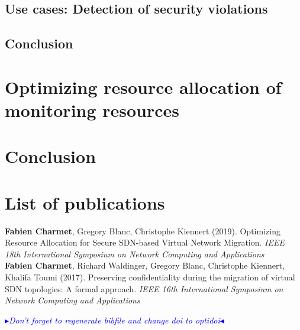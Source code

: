 \documentclass[a4paper, 11pt]{report}
\newcommand{\boxedtext}[1]{\fbox{\scriptsize\bfseries\textsf{#1}}}
\newcommand{\myremark}[2]{
   \textcolor{blue}{\boxedtext{#1}
      {\small$\blacktriangleright$\emph{\textsl{#2}}$\blacktriangleleft$}
}}
\newcommand\FC[1]{\myremark{FC}{#1}}
\theoremstyle{definition}
\begin{document}
\newpage
\section{Use cases: Detection of security violations}


\newpage
\section{Conclusion}


\newpage
\chapter{Optimizing resource allocation of monitoring resources}
\label{sec:RAprob}




\newpage


\newpage
\chapter{Conclusion}


\newpage
\chapter*{List of publications}
\textbf{Fabien Charmet}, Gregory Blanc, Christophe Kiennert (2019). Optimizing Resource Allocation for Secure SDN-based Virtual Network Migration. \textit{IEEE 18th International Symposium on Network Computing and Applications}\\

\textbf{Fabien Charmet}, Richard Waldinger, Gregory Blanc, Christophe Kiennert, Khalifa Toumi (2017). Preserving confidentiality during the migration of virtual SDN topologies: A formal approach. \textit{IEEE 16th International Symposium on Network Computing and Applications}

\newpage
\FC{Don't forget to regenerate bibfile and change doi to optidoi}
{}


\newpage
\begin{appendices}

\newpage
% 
\newpage

\end{appendices}
\end{document}
